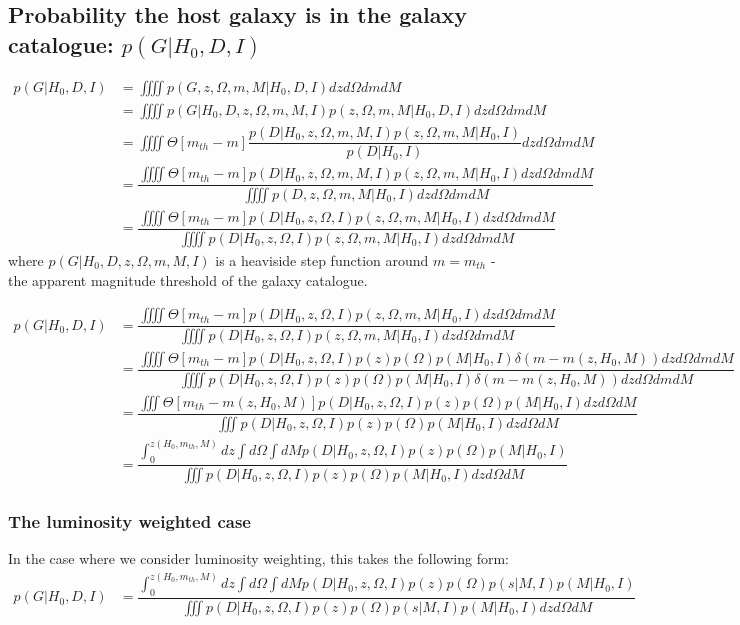 \documentclass[a4paper,10pt]{article}
\begin{document}
\subsection{Probability the host galaxy is in the galaxy catalogue: $p(G|H_0,D,I)$}


\begin{equation}
\begin{aligned}
p(G|H_0,D,I) &= \iiiint p(G,z,\Omega,m,M|H_0,D,I) dz d\Omega dm dM
\\ &= \iiiint p(G|H_0,D,z,\Omega,m,M,I) p(z,\Omega,m,M|H_0,D,I) dz d\Omega dm dM
\\ &= \iiiint \Theta[m_{th}-m] \dfrac{p(D|H_0,z,\Omega,m,M,I) p(z,\Omega,m,M|H_0,I)}{p(D|H_0,I)}  dz d\Omega dm dM
\\ &=  \dfrac{\iiiint \Theta[m_{th}-m] p(D|H_0,z,\Omega,m,M,I) p(z,\Omega,m,M|H_0,I) dz d\Omega dm dM}{\iiiint p(D,z,\Omega,m,M|H_0,I) dz d\Omega dm dM} 
\\ &=  \dfrac{\iiiint \Theta[m_{th}-m] p(D|H_0,z,\Omega,I) p(z,\Omega,m,M|H_0,I) dz d\Omega dm dM}{\iiiint p(D|H_0,z,\Omega,I) p(z,\Omega,m,M|H_0,I) dz d\Omega dm dM} 
\end{aligned}
\end{equation}
where $p(G|H_0,D,z,\Omega,m,M,I)$ is a heaviside step function around $m = m_{th}$ - the apparent magnitude threshold of the galaxy catalogue.

\begin{equation}
\begin{aligned}
p(G|H_0,D,I) &=  \dfrac{\iiiint \Theta[m_{th}-m] p(D|H_0,z,\Omega,I) p(z,\Omega,m,M|H_0,I) dz d\Omega dm dM}{\iiiint p(D|H_0,z,\Omega,I) p(z,\Omega,m,M|H_0,I) dz d\Omega dm dM} 
\\ &= \dfrac{\iiiint \Theta[m_{th}-m] p(D|H_0,z,\Omega,I) p(z)p(\Omega)p(M|H_0,I)\delta(m - m(z,H_0,M)) dz d\Omega dm dM}{\iiiint p(D|H_0,z,\Omega,I) p(z)p(\Omega)p(M|H_0,I)\delta(m - m(z,H_0,M)) dz d\Omega dm dM}
\\ &= \dfrac{\iiint \Theta[m_{th}-m(z,H_0,M)] p(D|H_0,z,\Omega,I) p(z)p(\Omega)p(M|H_0,I)dz d\Omega dM}{\iiint p(D|H_0,z,\Omega,I) p(z)p(\Omega)p(M|H_0,I) dz d\Omega dM}
\\ &= \dfrac{\int^{z(H_0,m_{th},M)}_0 dz \int d\Omega \int dM p(D|H_0,z,\Omega,I) p(z)p(\Omega)p(M|H_0,I)}{\iiint p(D|H_0,z,\Omega,I) p(z)p(\Omega)p(M|H_0,I) dz d\Omega dM}
\end{aligned}
\end{equation}


\subsubsection{The luminosity weighted case}
In the case where we consider luminosity weighting, this takes the following form:
\begin{equation}
\begin{aligned}
p(G|H_0,D,I) &= \dfrac{\int^{z(H_0,m_{th},M)}_0 dz \int d\Omega \int dM p(D|H_0,z,\Omega,I) p(z)p(\Omega) p(s|M,I) p(M|H_0,I)}{\iiint p(D|H_0,z,\Omega,I) p(z)p(\Omega) p(s|M,I) p(M|H_0,I) dz d\Omega dM}
\end{aligned}
\end{equation}
\end{document}
